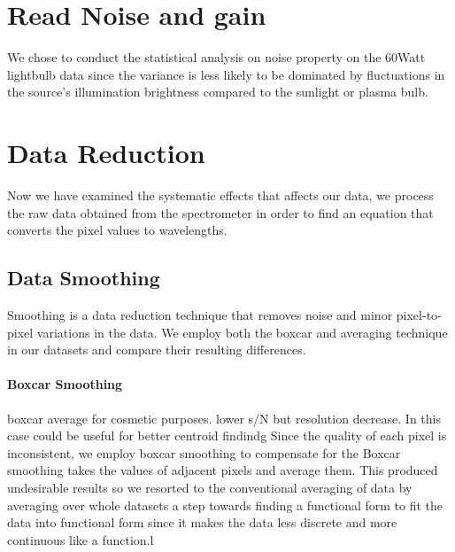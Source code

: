 \documentclass[authoryear, 12pt,5p, times]{elsarticle}
\begin{document}
\section{Read Noise and gain}
We chose to conduct the statistical analysis on noise property on the 60Watt lightbulb data since the variance is less likely to be dominated by fluctuations in the source's illumination brightness compared to the sunlight or plasma bulb.
\section{Data Reduction}
 Now we have examined the systematic effects that affects our data, we process the raw data obtained from the spectrometer in order to find an equation that converts the pixel values to wavelengths.
  \subsection{Data Smoothing}
  Smoothing is a data reduction technique that removes noise and minor pixel-to-pixel variations in the data. We employ both the boxcar and averaging technique in our datasets and compare their resulting differences.
  \paragraph*{Boxcar Smoothing}
  
   boxcar average for cosmetic purposes. lower s/N but resolution decrease. In this case could be useful for better centroid findindg 
Since the quality of each pixel is inconsistent, we employ boxcar smoothing to compensate for the 
Boxcar smoothing takes the values of adjacent pixels and average them. 
This produced undesirable results so we resorted to the conventional averaging of data by averaging over whole datasets
  a step towards finding a functional form to fit the data  into functional form since it makes the data less discrete and more continuous like a function.l
\end{document}
